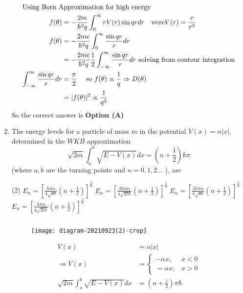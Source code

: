 \begin{enumerate}
\begin{tasks}
\end{tasks}
\begin{answer}
\begin{align*}
\intertext{Using Born Approximation for high energy}
f(\theta)&=-\frac{2 m}{\hbar^{2} q} \int_{0}^{\infty} r V(r) \sin q r d r \quad\text{were} V(r)=\frac{c}{r^{2}}\\
f(\theta)&=-\frac{2 m c}{\hbar^{2} q} \int_{0}^{\infty} \frac{\sin q r}{r} d r\\&=-\frac{2 m c}{\hbar^{2} q} \frac{1}{2} \int_{-\infty}^{\infty} \frac{\sin q r}{r} d r\text{ solving from contour integration}\\
\int_{-\infty}^{\infty} \frac{\sin q r}{r} d r&=\frac{\pi}{2} \quad\text{ so }f(\theta) \propto \frac{1}{q} \Rightarrow D(\theta)\\&=|f(\theta)|^{2} \propto \frac{1}{q^{2}}
\end{align*}
So the correct answer is \textbf{Option (A)}
\end{answer}	
\item 	 The energy levels for a particle of mass $m$ in the potential $V(x)=\alpha|x|$, determined in the $W K B$ approximation
$$
\sqrt{2 m} \int_{a}^{b} \sqrt{E-V(x)} d x=\left(n+\frac{1}{2}\right) \hbar \pi
$$
(where $a, b$ are the turning points and $n=0,1,2 \ldots$ ), are
{}
\begin{tasks}(2)
\task[\textbf{A.}] $E_{n}=\left[\frac{h \pi \alpha}{4 \sqrt{m}}\left(n+\frac{1}{2}\right)\right]^{\frac{2}{3}}$
\task[\textbf{B.}] $E_{n}=\left[\frac{3 h \pi \alpha}{4 \sqrt{2 m}}\left(n+\frac{1}{2}\right)\right]^{\frac{2}{3}}$
\task[\textbf{C.}] $E_{n}=\left[\frac{3 h \pi \alpha}{4 \sqrt{m}}\left(n+\frac{1}{2}\right)\right]^{\frac{2}{3}}$
\task[\textbf{D.}] $E_{n}=\left[\frac{h \pi \alpha}{4 \sqrt{2 m}}\left(n+\frac{1}{2}\right)\right]^{\frac{2}{3}}$
\end{tasks}
\begin{answer}$\left. \right. $
\begin{figure}[H]
	\centering
	\texttt{[image: diagram-20210923(2)-crop]}
\end{figure}
\begin{align*}
V(x)&=\alpha|x|\\
\Rightarrow V(x)&=\left\{\begin{array}{ll}-\alpha x, & x<0 \\ =\alpha x, & x>0\end{array}\right.\\
\sqrt{2 m} \int_{a}^{b} \sqrt{E-V(x)} d x&=\left(n+\frac{1}{2}\right) \pi \hbar\\

\end{align*}
\end{answer}
\end{enumerate}
